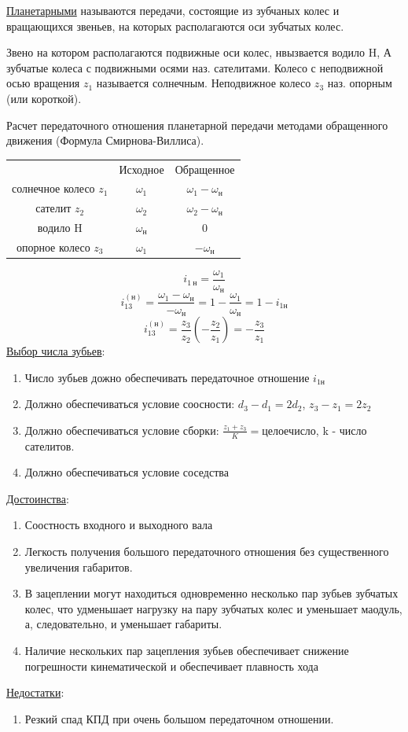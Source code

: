 \documentclass{article}
\begin{document}
\underline{Планетарными} называются передачи, состоящие из зубчаных колес и вращающихся звеньев, на которых располагаются оси зубчатых колес.

Звено на котором располагаются подвижные оси колес, нвызвается водило H, А зубчатые колеса с подвижными осями наз. сателитами. Колесо с неподвижной осью вращения $z_1$ называется солнечным. Неподвижное колесо $z_3$ наз. опорным (или короткой).

Расчет передаточного отношения планетарной передачи методами обращенного движения (Формула Смирнова-Виллиса).

\begin{tabular}{ccc}
	& Исходное & Обращенное\\
	солнечное колесо $z_1$ & $\omega_1$ & $\omega_1 - \omega_н$\\
	сателит $z_2$ & $\omega_2$ & $\omega_2 - \omega_н$\\
	водило H & $\omega_н$ & 0\\
	опорное колесо $z_3$ & $\omega_1$ & $- \omega_н$\\
\end{tabular}
$$
i_{1\:н} = \frac{\omega_1}{\omega_н}
$$
$$
i_{13}^{(н)} = \frac{\omega_1 - \omega_н}{- \omega_н}  = 1 - \frac{\omega_1}{\omega_н} = 1 - i_{1н}
$$
$$
i_{13}^{(н)} = \frac{z_3}{z_2} \left(- \frac{z_2}{z_1} \right) = - \frac{z_3}{z_1}
$$
\underline{Выбор числа зубьев}:
\begin{enumerate}
	\item Число зубьев дожно обеспечивать передаточное отношение $i_{1н}$
	\item Должно обеспечиваться условие соосности: $d_3 - d_1 = 2 d_2$, $z_3 - z_1 = 2 z_2$
	\item Должно обеспечиваться условие сборки: $\frac{z_1 + z_3}{K} = целое число$, k - число сателитов.
	\item Должно обеспечиваться условие соседства
\end{enumerate}
\underline{Достоинства}:
\begin{enumerate}
	\item Соостность входного и выходного вала
	\item Легкость получения большого передаточного отношения без существенного увеличения габаритов.
	\item В зацеплении могут находиться одновременно несколько пар зубьев зубчатых колес, что удменьшает нагрузку на пару зубчатых колес и уменьшает маодуль, а, следовательно, и уменьшает габариты.
	\item Наличие нескольких пар зацепления зубьев обеспечивает снижение погрешности кинематической и обеспечивает плавность хода
\end{enumerate}
\underline{Недостатки}:
\begin{enumerate}
	\item Резкий спад КПД при очень большом передаточном отношении.
\end{enumerate}
\end{document}
